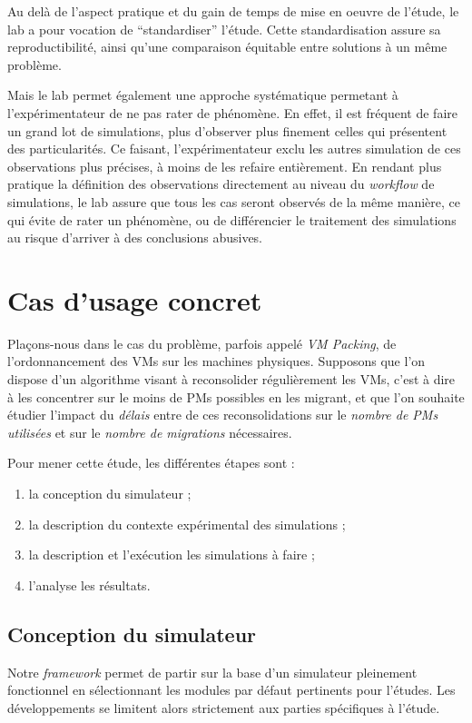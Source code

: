 \documentclass[parallelisme]{compas2017}
\begin{document}
Au delà de l'aspect pratique et du gain de temps de mise en oeuvre de l'étude, le lab a pour vocation
de ``standardiser'' l'étude. Cette standardisation assure sa reproductibilité, ainsi qu'une comparaison
équitable entre solutions à un même problème.

Mais le lab permet également une approche systématique permetant à l'expérimentateur de ne pas rater 
de phénomène. En effet, il est fréquent de faire un grand lot de simulations, plus d'observer plus
finement celles qui présentent des particularités. Ce faisant, l'expérimentateur exclu les autres 
simulation de ces observations plus précises, à moins de les refaire entièrement. En rendant plus 
pratique la définition des observations directement au niveau du \textit{workflow} de simulations, 
le lab assure que tous les cas seront observés de la même manière, ce qui évite de rater un phénomène,
ou de différencier le traitement des simulations au risque d'arriver à des conclusions abusives.


\section{Cas d'usage concret}

Plaçons-nous dans le cas du problème, parfois appelé \textit{VM Packing}, de 
l'ordonnancement des VMs sur les machines physiques. 
Supposons que l'on dispose d'un algorithme visant à reconsolider 
régulièrement les VMs, c'est à dire à les concentrer sur le moins de PMs 
possibles en les migrant, et que l'on souhaite étudier l'impact du \emph{délais}
entre de ces reconsolidations sur le \emph{nombre de PMs utilisées} et sur le 
\emph{nombre de migrations} nécessaires. 

Pour mener cette étude, les différentes étapes sont :
\begin{enumerate}
 \item la conception du simulateur ;
 \item la description du contexte expérimental des simulations ;
 \item la description et l'exécution les simulations à faire ;
 \item l'analyse les résultats.
\end{enumerate}


\subsection{Conception du simulateur}

Notre \textit{framework} permet de partir sur la base d'un simulateur pleinement 
fonctionnel en sélectionnant les modules par défaut pertinents pour l'études. 
Les développements se limitent alors strictement aux parties spécifiques à 
l'étude.
\end{document}
